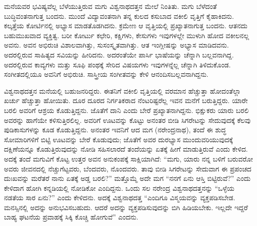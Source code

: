 ಮನೆಯವರ ಭವಿಷ್ಯವೆಲ್ಲ ಬೆಳೆಯುತ್ತಿರುವ ಮಗು ವಿಶ್ವನಾಥದತ್ತನ ಮೇಲೆ ನಿಂತಿತು. ಮಗು ಬೆಳೆದಂತೆ ಬುದ್ಧಿವಂತನಾಗುತ್ತ ಬಂದನು. ಮುಂದೆ ವಿದ್ಯಾವಂತನಾಗಿ ತನ್ನ ಕುಲದ ಕಸುಬಾದ ವಕೀಲಿ ವೃತ್ತಿಗೆ ಕೈಹಾಕಿದನು. ಕಲ್ಕತ್ತೆಯ ಕೋರ್ಟಿನಲ್ಲಿ ಅಭ್ಯಾಸ ಮಾಡತೊಡಗಿದನು. ಕ್ರಮೇಣ ಆ ವೃತ್ತಿಯಲ್ಲಿ ಪ್ರಖ್ಯಾತನಾಗುತ್ತ ಬಂದನು. ಆತನದು ಬಹುಮುಖವಾದ ವ್ಯಕ್ತಿತ್ವ. ಬರೀ ಕೋರ್ಟು ಕಛೇರಿ, ಕಕ್ಷಿಗಳು, ಕೇಸುಗಳು ಇವುಗಳಲ್ಲೇ ಮುಳುಗಿ ಹೋದ ವಕೀಲನಲ್ಲ ಅವನು. ಅವನ ಅಭಿರುಚಿ ವಿಶಾಲವಾಗಿತ್ತು, ಸುಸಂಸ್ಕೃತವಾಗಿತ್ತು. ಆತ ಇಂಗ್ಲೀಷನ್ನು ಅಭ್ಯಾಸ ಮಾಡಿದವನು. ಅದರಲ್ಲಿರುವ ಸಾಹಿತ್ಯದ ಸವಿಯನ್ನು ಹೀರಿದನು. ಅದರಂತೆಯೇ ಪಾರ್ಸಿ ಭಾಷೆಯನ್ನು ಚೆನ್ನಾಗಿ ಬಲ್ಲವನಾಗಿದ್ದ. ಅದರಲ್ಲಿರುವ ಕಾವ್ಯಗಳು ಮತ್ತು ಸೂಫಿ ಪಂಥಕ್ಕೆ ಸೇರಿದ ವಿಷಯಗಳು ಇವುಗಳನ್ನೆಲ್ಲ ಚೆನ್ನಾಗಿ ತಿಳಿದುಕೊಂಡ. ಸಂಗೀತದಲ್ಲಿಯೂ ಅವನಿಗೆ ಅಭಿರುಚಿ. ಸಾಸ್ತ್ರೀಯ ಸಂಗೀತವನ್ನು ಕೇಳಿ ಆನಂದಿಸಬಲ್ಲವನಾಗಿದ್ದನು.

ವಿಶ್ವನಾಥದತ್ತನ ಮನೆಯಲ್ಲಿ ಬಹುಜನರಿದ್ದರು. ಈತನಿಗೆ ವಕೀಲಿ ವೃತ್ತಿಯಲ್ಲಿ ವರಮಾನ ಹೆಚ್ಚುತ್ತಾ ಹೋದಂತೆಲ್ಲಾ ಖರ್ಚು ಹೆಚ್ಚುತ್ತಾ ಹೋಯಿತು. ದೂರ ದೂರದ ನಿರ್ಗತಿಕರಾದ ನೆಂಟರಿಷ್ಟರೆಲ್ಲ ಇವನ ಮನೆಗೆ ಬರುತ್ತಿದ್ದರು. ಯಾರೇ ಬರಲಿ ಅವರಿಗೆ ಆಶ್ರಯ ಕೊಡುತ್ತಿದ್ದನು. ಜೊತೆಗೆ ದಾನಿ ಎಂದು ಬೇರೆ ಪ್ರಖ್ಯಾತನಾಗಿದ್ದನು. ಭಿಕ್ಷುಕರು ಯಾರು ಬರಲಿ ಅವರನ್ನು ಹಾಗೆಯೇ ಕಳಿಸುತ್ತಿರಲಿಲ್ಲ. ಅವರಿಗೆ ಊಟವನ್ನು ಕೊಟ್ಟು ಅನಂತರ ಬೀಡಿ ಸಿಗರೇಟನ್ನು ಸೇದುವುದಕ್ಕೆ ಕೆಲವು ಪುಡಿಕಾಸುಗಳನ್ನು ಕೂಡ ಕೊಡುತ್ತಿದ್ದನು. ಅನಂತರ ಇವನಿಗೆ ಆದ ಮಗ (ನರೇಂದ್ರನಾಥ), ತಂದೆ ಈ ಶುದ್ಧ ಸೋಮಾರಿಗಳಿಗೆ ಬಿಟ್ಟಿ ಊಟವನ್ನು ಬೇರೆ ಕೊಡುವುದು; ಜೊತೆಗೆ ಅವರ ದುರಭ್ಯಾಸ ಮುಂದುವರಿಯುವುದಕ್ಕೆ ದಕ್ಷಿಣೆಯನ್ನೂ ಕೊಡುತ್ತಿರುವುದನ್ನು ನೋಡಿ ಸಹಿಸಲಾರದೆ ತಂದೆಯನ್ನು ಏತಕ್ಕೆ ಹೀಗೆ ಮಾಡುತ್ತಿರುವೆ ಎಂದು ಕೇಳಿದ. ಅದಕ್ಕೆ ತಂದೆ ಮಗುವಿಗೆ ಕೊಟ್ಟ ಉತ್ತರ ಅವನ ಅನುಕಂಪಕ್ಕೆ ಸಾಕ್ಷಿಯಾಗಿದೆ: “ಮಗು, ಯಾರು ನನ್ನ ಬಳಿಗೆ ಬರುವರೋ ಅವರು ಜೀವನದಲ್ಲಿ ನೆಚ್ಚುಗೆಟ್ಟವರು, ಬೆಂದವರು, ನೊಂದವರು. ತಾವು ಬೀಡಿ ಸಿಗರೇಟನ್ನು ಸೇದುವಾಗ ಈ ಪ್ರಪಂಚದ ದುಃಖವನ್ನು ಮರೆತರೆ ನಾನು ಏತಕ್ಕೆ ಅಡ್ಡ ಬರಲಿ?” ಮತ್ತೊಮ್ಮೆ ಅದೇ ಮಗ “ನನಗೆ ಏನು ಆಸ್ತಿ ಬಿಟ್ಟಿರುವೆ?” ಎಂದು ಕೇಳಿದಾಗ ಹೋಗಿ ಕನ್ನಡಿಯಲ್ಲಿ ನೋಡಿಕೋ ಎಂದಿದ್ದನು. ಒಂದು ಸಲ ನರೇಂದ್ರ ವಿಶ್ವನಾಥದತ್ತನನ್ನು “ಒಳ್ಳೆಯ ನಡತೆಯ ಸಾರ ಏನು?” ಎಂದು ಕೇಳಿದನು. ಅದಕ್ಕೆ ವಿಶ್ವನಾಥದತ್ತ “ಎಂದಿಗೂ ವಿಸ್ಮಯವನ್ನು ವ್ಯಕ್ತಪಡಿಸಬೇಡ. ಮನಸ್ಸಿನಲ್ಲಿ ಅದನ್ನು ಅನುಭವಿಸಬಹುದು. ಆದರೆ ಅದನ್ನು ವ್ಯಕ್ತಪಡಿಸುವುದನ್ನು ಬಿಗಿ ಹಿಡಿಯಬೇಕು. ಇಲ್ಲದೇ ಇದ್ದರೆ ಬಾಹ್ಯ ಘಟನೆಯ ಪ್ರವಾಹಕ್ಕೆ ಸಿಕ್ಕಿ ಕೊಚ್ಚಿ ಹೋಗುವೆ” ಎಂದನು.

